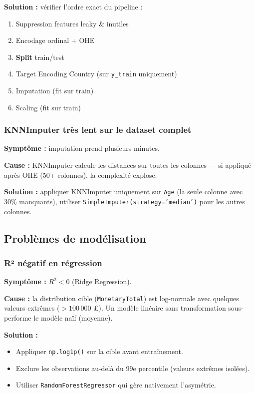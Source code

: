\documentclass[11pt,a4paper]{article}
\begin{document}
\textbf{Solution :} vérifier l'ordre exact du pipeline :
\begin{enumerate}[noitemsep]
  \item Suppression features leaky \& inutiles
  \item Encodage ordinal + OHE
  \item \textbf{Split} train/test
  \item Target Encoding Country (sur \texttt{y\_train} uniquement)
  \item Imputation (fit sur train)
  \item Scaling (fit sur train)
\end{enumerate}

\subsubsection{KNNImputer très lent sur le dataset complet}

\textbf{Symptôme :} imputation prend plusieurs minutes.

\textbf{Cause :} KNNImputer calcule les distances sur toutes les colonnes — si appliqué après OHE (50+ colonnes), la complexité explose.

\textbf{Solution :} appliquer KNNImputer uniquement sur \texttt{Age} (la seule colonne avec 30\% manquants), utiliser \texttt{SimpleImputer(strategy='median')} pour les autres colonnes.

\subsection{Problèmes de modélisation}

\subsubsection{R² négatif en régression}

\textbf{Symptôme :} $R^2 < 0$ (Ridge Regression).

\textbf{Cause :} la distribution cible (\texttt{MonetaryTotal}) est log-normale avec quelques valeurs extrêmes ($> 100\,000$ £). Un modèle linéaire sans transformation sous-performe le modèle naïf (moyenne).

\textbf{Solution :}
\begin{itemize}[noitemsep]
  \item Appliquer \texttt{np.log1p()} sur la cible avant entraînement.
  \item Exclure les observations au-delà du 99e percentile (valeurs extrêmes isolées).
  \item Utiliser \texttt{RandomForestRegressor} qui gère nativement l'asymétrie.
\end{itemize}
\end{document}
